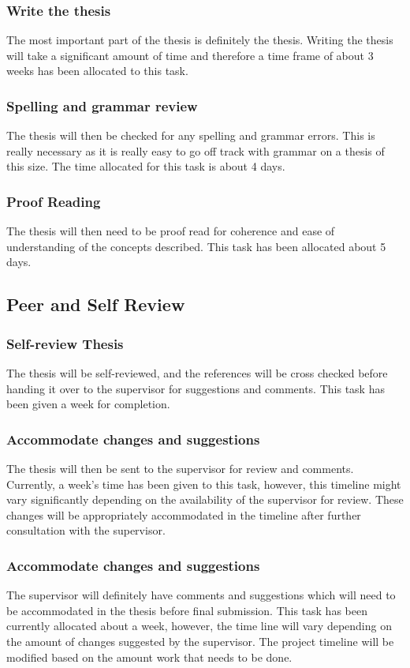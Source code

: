 \documentclass[a4paper,twoside,phd]{BYUPhys}
\begin{document}
\subsubsection{Write the thesis}
The most important part of the thesis is definitely the thesis.
Writing the thesis will take a significant amount of time and therefore a time frame
of about 3 weeks has been allocated to this task.
\subsubsection{Spelling and grammar review}
The thesis will then be checked for any spelling
and grammar errors. This is really necessary as it is really easy to go off track with
grammar on a thesis of this size. The time allocated for this task is about 4 days.
\subsubsection{Proof Reading}
The thesis will then need to be proof read for coherence and ease of understanding of the concepts described. This task has been allocated about 5
days.
\subsection{Peer and Self Review}
\subsubsection{Self-review Thesis}
The thesis will be self-reviewed, and the references will be
cross checked before handing it over to the supervisor for suggestions and
comments. This task has been given a week for completion.
\subsubsection{Accommodate changes and suggestions}
The thesis will then be sent to the supervisor for
review and comments. Currently, a week’s time has been given to this task, however, this timeline might vary significantly depending on the availability of the supervisor for review. These changes will be appropriately accommodated in the timeline after further consultation with the supervisor.
\subsubsection{Accommodate changes and suggestions}
The supervisor will definitely have comments and suggestions which will need to be accommodated in the thesis before final submission. This task has been currently allocated about a week, however, the time line will vary depending on the amount of changes suggested by the supervisor. The project timeline will be modified based on the amount work that needs to be done.
\end{document}
